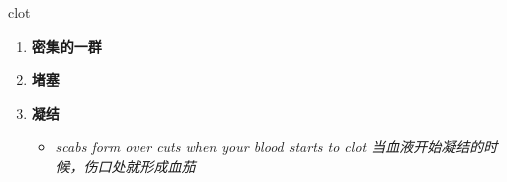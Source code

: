 
\begin{frame}
{\huge clot}
\begin{center}
\begin{enumerate}\Large
  \item \textbf{密集的一群}
  \item \textbf{堵塞}
  \item \textbf{凝结}
  \begin{itemize}
    \item \em{\Large{scabs form over cuts when your blood starts to clot 当血液开始凝结的时候，伤口处就形成血茄}}
  \end{itemize}
\end{enumerate}
\end{center}
\end{frame}
